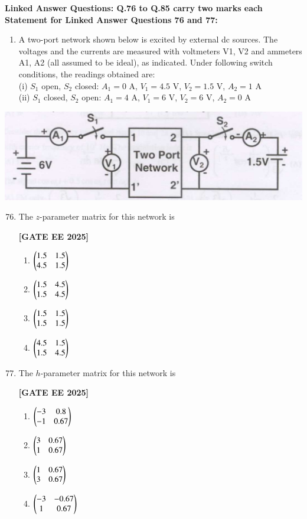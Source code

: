 \documentclass[12pt]{article}
\begin{document}
\vspace{1em}
 \large \textbf {Linked Answer Questions: Q.76 to Q.85 carry two marks each}
 \large \textbf {Statement for Linked Answer Questions 76 and 77: }
\vspace{1em}
\begin{enumerate}
\item A two-port network shown below is excited by external dc sources. The voltages and the currents are measured with voltmeters V1, V2 and ammeters A1, A2 (all assumed to be ideal), as indicated. Under following switch conditions, the readings obtained are: \\
(i) $S_1$ open, $S_2$ closed: $A_1=0$ A, $V_1=4.5$ V, $V_2=1.5$ V, $A_2=1$ A \\
(ii) $S_1$ closed, $S_2$ open: $A_1=4$ A, $V_1=6$ V, $V_2=6$ V, $A_2=0$ A
\end{enumerate}
\begin{center}
\includegraphics[width=0.6\columnwidth]{figs/q7677.png}
\end{center}

\begin{enumerate}[leftmargin=*, label=\textbf{Q.\arabic*:}]
\setcounter{enumi}{75}

\item The $z$-parameter matrix for this network is
 
\noindent \textbf{[GATE EE 2025]}
\begin{enumerate}
  \item $\begin{pmatrix} 1.5 & 1.5 \\ 4.5 & 1.5 \end{pmatrix}$
  \item $\begin{pmatrix} 1.5 & 4.5 \\ 1.5 & 4.5 \end{pmatrix}$
  \item $\begin{pmatrix} 1.5 & 1.5 \\ 1.5 & 1.5 \end{pmatrix}$
  \item $\begin{pmatrix} 4.5 & 1.5 \\ 1.5 & 4.5 \end{pmatrix}$
\end{enumerate}

\item The $h$-parameter matrix for this network is
 
\noindent \textbf{[GATE EE 2025]}
\begin{enumerate}
  \item $\begin{pmatrix} -3 & 0.8 \\ -1 & 0.67 \end{pmatrix}$
  \item $\begin{pmatrix} 3 & 0.67 \\ 1 & 0.67 \end{pmatrix}$
  \item $\begin{pmatrix} 1 & 0.67 \\ 3 & 0.67 \end{pmatrix}$
  \item $\begin{pmatrix} -3 & -0.67 \\ 1 & 0.67 \end{pmatrix}$
\end{enumerate}

\end{enumerate}
\end{document}

